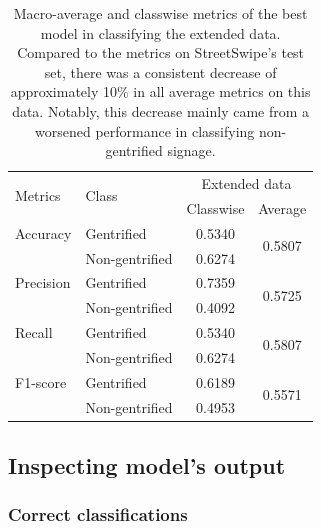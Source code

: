\begin{table}[h!]
\begin{tabular}{llcc}
\toprule
\multirow{2}{*}{Metrics}   & \multirow{2}{*}{Class} & \multicolumn{2}{c}{Extended data}   \\ \cline{3-4} 
                           &                        & Classwise & Average                 \\ \hline
Accuracy                   & Gentrified             & 0.5340    & \multirow{2}{*}{0.5807} \\
                           & Non-gentrified         & 0.6274    &                         \\
Precision                  & Gentrified             & 0.7359    & \multirow{2}{*}{0.5725} \\
                           & Non-gentrified         & 0.4092    &                         \\
Recall                     & Gentrified             & 0.5340    & \multirow{2}{*}{0.5807} \\
                           & Non-gentrified         & 0.6274    &                         \\
F1-score                   & Gentrified             & 0.6189    & \multirow{2}{*}{0.5571} \\
                           & Non-gentrified         & 0.4953    &                         \\
\bottomrule
\end{tabular}
\vspace{\baselineskip}
\caption{Macro-average and classwise metrics of the best model in classifying the extended data. Compared to the metrics on StreetSwipe's test set, there was a consistent decrease of approximately 10\% in all average metrics on this data. Notably, this decrease mainly came from a worsened performance in classifying non-gentrified signage.}
\label{fig:resnet50_pano}
\vspace{-5mm}
\end{table}

\subsection{Inspecting model's output}

\subsubsection{Correct classifications}


